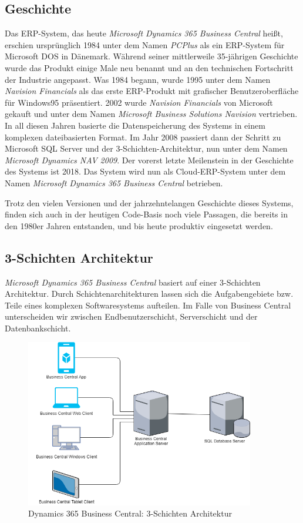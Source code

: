\subsection{Geschichte}
\label{subsec:Geschichte}
Das ERP-System, das heute \textit{Microsoft Dynamics 365 Business Central} heißt, erschien ursprünglich 1984 unter dem Namen \textit{PCPlus} als ein ERP-System für Microsoft DOS in Dänemark\cite{DesignAndImplementationGayer}. Während seiner mittlerweile 35-jährigen Geschichte wurde das Produkt einige Male neu benannt und an den technischen Fortschritt der Industrie angepasst. Was 1984 begann, wurde 1995 unter dem Namen \textit{Navision Financials} als das erste ERP-Produkt mit grafischer Benutzeroberfläche für Windows95 präsentiert. 2002 wurde \textit{Navision Financials} von Microsoft gekauft und unter dem Namen \textit{Microsoft Business Solutions Navision} vertrieben. In all diesen Jahren basierte die Datenspeicherung des Systems in einem komplexen dateibasierten Format. Im Jahr 2008 passiert dann der Schritt zu Microsoft SQL Server und der 3-Schichten-Architektur, nun unter dem Namen \textit{Microsoft Dynamics NAV 2009}. Der vorerst letzte Meilenstein in der Geschichte des Systems ist 2018. Das System wird nun als Cloud-ERP-System unter dem Namen \textit{Microsoft Dynamics 365 Business Central} betrieben.

Trotz den vielen Versionen und der jahrzehntelangen Geschichte dieses Systems, finden sich auch in der heutigen Code-Basis noch viele Passagen, die bereits in den 1980er Jahren entstanden, und bis heute produktiv eingesetzt werden.

\subsection{3-Schichten Architektur}
\label{subsec:3-Schichten Architektur}
\textit{Microsoft Dynamics 365 Business Central} basiert auf einer 3-Schichten Architektur. Durch Schichtenarchitekturen lassen sich die Aufgabengebiete bzw. Teile eines komplexen Softwaresystems aufteilen. Im Falle von Business Central unterscheiden wir zwischen Endbenutzerschicht, Serverschicht und der Datenbankschicht.

\begin{figure}[h]
	\centering
	\includegraphics[width=100mm]{images/3TierArchitecture.png}
	\caption{Dynamics 365 Business Central: 3-Schichten Architektur}
	\label{fig:Image3TierArchitecture}
\end{figure}

